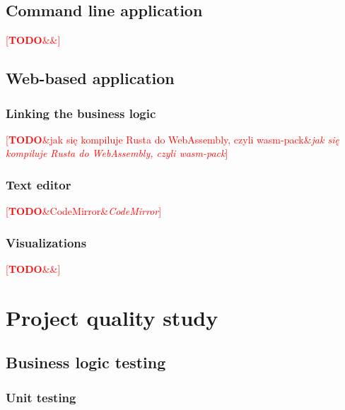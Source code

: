 \documentclass[english,engineering]{wizthesis}
\newcommand{\todo}[1]{%
  \textcolor{red}{[\textbf{TODO}\ifx&#1&{}\else{ }\fi\emph{#1}]}%
}
\begin{document}
\section{Command line application}

\todo{}

\section{Web-based application}

\subsection{Linking the business logic}

\todo{jak się kompiluje Rusta do WebAssembly, czyli wasm-pack}

\subsection{Text editor}

\todo{CodeMirror}

\subsection{Visualizations}

\todo{}

\chapter{Project quality study}

\section{Business logic testing} \label{sec:testing}

\subsection{Unit testing}
\end{document}
